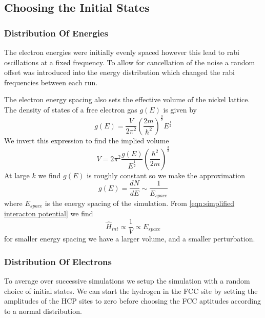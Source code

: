 \subsection{Choosing the Initial States}

\subsubsection{Distribution Of Energies}
The electron energies were
initially evenly spaced however
this lead to rabi oscillations
at a fixed frequency.
To allow for cancellation
of the noise a
random offset was introduced
into the energy distribution
which changed the rabi frequencies
between each run.

The electron energy spacing
also sets the effective volume of the nickel
lattice. The density of states of a free electron
gas \(g(E)\) is given by~\cite{KittelCharles1953Itss}
\begin{equation}
    g(E) = \frac{V}{2\pi^2}
    {(\frac{2m}{\hbar^2})}^{\frac{3}{2}}
    E^{\frac{1}{2}}
\end{equation}
We invert this expression
to find the implied volume
\begin{equation}
    V = 2\pi^2
    \frac{g(E)}{E^{\frac{1}{2}}}
    {(\frac{\hbar^2}{2m})}^{\frac{3}{2}}
\end{equation}
At large \(k\) we find
\(g(E)\) is roughly
constant so we make the approximation
\begin{equation}
    g(E) = \frac{dN}{dE} \sim \frac{1}{E_{space}}
\end{equation}
where \(E_{space}\) is the energy spacing
of the simulation. From \cref{eqn:simplified interacton potential} we find
\begin{equation}
    \hat{H}_{int} \propto \frac{1}{V} \propto E_{space}
    \label{eqn:energy spacing dependance of interaction hamiltonian}
\end{equation}
for smaller
energy spacing we have
a larger volume, and a smaller
perturbation.

\subsubsection{Distribution Of Electrons}
To average over successive
simulations we setup the
simulation with a random
choice of initial states.
We can start the hydrogen
in the FCC site by setting the
amplitudes of the HCP sites to zero
before choosing the FCC aptitudes according to
a normal distribution.

